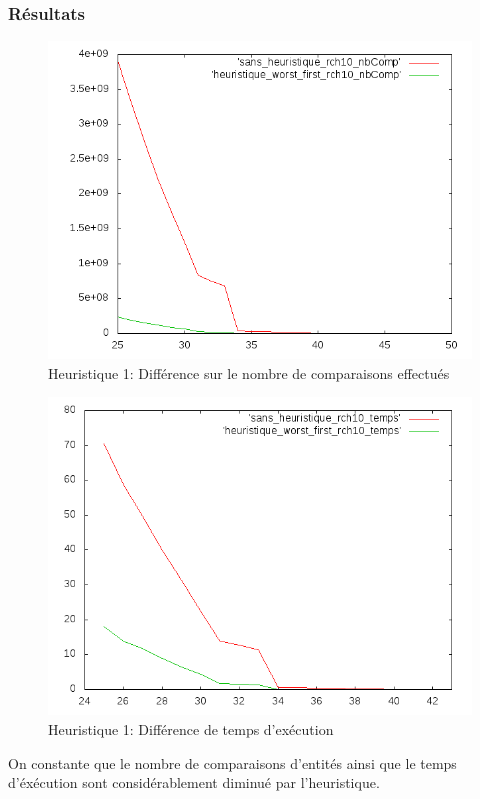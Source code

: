 \documentclass[a4paper,10pt]{article}
\begin{document}
\subsubsection*{Résultats}
\begin{figure}[H]
\begin{center}
\includegraphics[scale=0.6]{./graphique/diff1_nbComp.png}
\end{center}
\caption{Heuristique 1: Différence sur le nombre de comparaisons effectués}
\end{figure}
\begin{figure}[H]
\begin{center}
\includegraphics[scale=0.6]{./graphique/diff1_temps.png}
\end{center}
\caption{Heuristique 1: Différence de temps d'exécution}
\end{figure}
On constante que le nombre de comparaisons d'entités ainsi que le temps d'éxécution sont considérablement diminué par l'heuristique.
\end{document}
